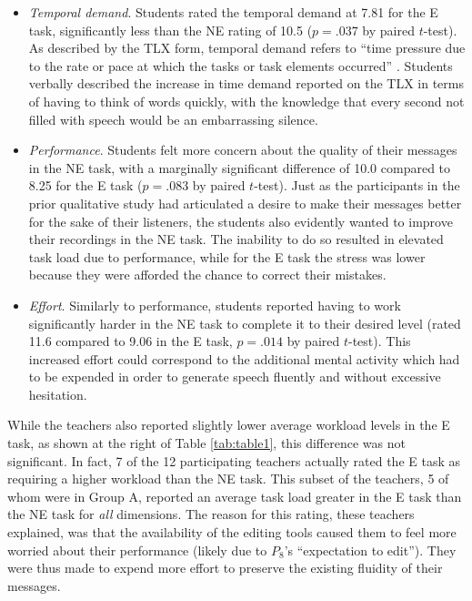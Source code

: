 \begin{itemize}
	\item \emph{Temporal demand}. Students rated the temporal demand at 7.81 for the E task, significantly less than the NE rating of 10.5 ($p=.037$ by paired $t$-test). 
	As described by the TLX form, temporal demand refers to ``time pressure due to the rate or pace at which the tasks or task elements occurred'' \cite{nasatlx}.
	Students verbally described the increase in time demand reported on the TLX in terms of having to think of words quickly, with the knowledge that every second not filled with speech would be an embarrassing silence.
	\item \emph{Performance}. Students felt more concern about the quality of their messages in the NE task, with a marginally significant difference of 10.0 compared to 8.25 for the E task ($p=.083$ by paired $t$-test). 
	Just as the participants in the prior qualitative study had articulated a desire to make their messages better for the sake of their listeners, the students also evidently wanted to improve their recordings in the NE task. 
	The inability to do so resulted in elevated task load due to performance, while for the E task the stress was lower because they were afforded the chance to correct their mistakes.
	\item \emph{Effort}. Similarly to performance, students reported having to work significantly harder in the NE task to complete it to their desired level (rated 11.6 compared to 9.06 in the E task, $p=.014$ by paired $t$-test). 
	This increased effort could correspond to the additional mental activity which had to be expended in order to generate speech fluently and without excessive hesitation.
\end{itemize}

While the teachers also reported slightly lower average workload levels in the E task, as shown at the right of Table \ref{tab:table1}, this difference was not significant.
In fact, 7 of the 12 participating teachers actually rated the E task as requiring a higher workload than the NE task.
This subset of the teachers, 5 of whom were in Group A, reported an average task load greater in the E task than the NE task for \emph{all} dimensions.
The reason for this rating, these teachers explained, was that the availability of the editing tools caused them to feel more worried about their performance (likely due to $P_8$'s ``expectation to edit'').
They were thus made to expend more effort to preserve the existing fluidity of their messages.


